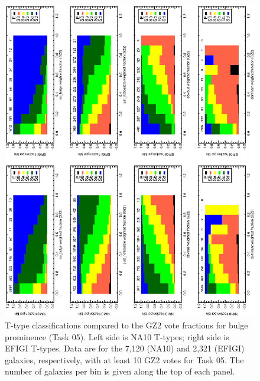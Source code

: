 \documentclass[useAMS,usenatbib]{mn2e}
\begin{document}
\begin{figure}
\includegraphics[angle=-90,width=7.0in]{figures/bulgeprominence_color.ps}
\caption{T-type classifications compared to the GZ2 vote fractions for bulge prominence (Task 05). Left side is NA10 T-types; right side is EFIGI T-types. Data are for the 7,120 (NA10) and 2,321 (EFIGI) galaxies, respectively, with at least 10 GZ2 votes for Task 05. The number of galaxies per bin is given along the top of each panel. 
\label{fig-bulgeprominence}}
\end{figure}
\end{document}
